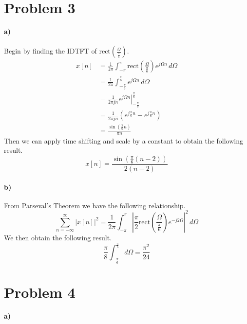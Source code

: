 \documentclass[12pt]{article}
\begin{document}
\section*{Problem 3}

\paragraph{a)}

Begin by finding the IDTFT of \(\text{rect}\left(\frac{\Omega}{\frac{\pi}{6}}\right)\).
\begin{align*}
    x[n] &= \frac{1}{2\pi}\int_{-\pi}^\pi \text{rect}\left(\frac{\Omega}{\frac{\pi}{6}}\right) e^{j\Omega n}\,d\Omega\\
    &=\frac{1}{2\pi}\int_{-\frac{\pi}{6}}^\frac{\pi}{6} e^{j\Omega n}\,d\Omega\\
    &=\frac{1}{2\pi jn}\left.e^{j\Omega n}\right|_{-\frac{\pi}{6}}^\frac{\pi}{6}\\
    &=\frac{1}{2\pi jn}(e^{j\frac{\pi}{6} n}-e^{j\frac{\pi}{6} n})\\
    &=\frac{\sin(\frac{\pi}{6} n)}{\pi n}
\end{align*}
Then we can apply time shifting and scale by a constant to obtain the following result.
\[x[n] = \frac{\sin(\frac{\pi}{6} (n-2))}{2(n-2)}\]

\paragraph{b)}

From Parseval's Theorem we have the following relationship.
\[\sum_{n=-\infty}^\infty |x[n]|^2 = \frac{1}{2\pi}\int_{-\pi}^{\pi} \left|\frac{\pi}{2}\text{rect}\left(\frac{\Omega}{\frac{\pi}{6}}\right) e^{-j2\Omega}\right|^2\,d\Omega\]
We then obtain the following result.
\[\frac{\pi}{8}\int_{-\frac{\pi}{6}}^\frac{\pi}{6} d\Omega = \frac{\pi^2}{24}\]

\section*{Problem 4}

\paragraph{a)}
\end{document}
